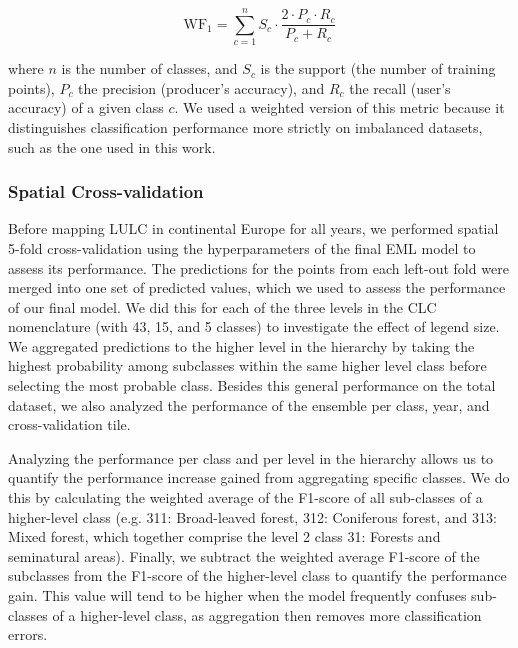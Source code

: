     \begin{equation}
        \mathrm{WF}_1 = \sum_{c=1}^{n}{S_{c} \cdot \frac{2 \cdot P_{c} \cdot R_{c}}{P_{c} + R_{c}}}
    \end{equation}
    
    \noindent where $n$ is the number of classes, and $S_{c}$ is the support (the number of training points), $P_{c}$ the precision (producer's accuracy), and $R_{c}$ the recall (user's accuracy) of a given class $c$. We used a weighted version of this metric because it distinguishes classification performance more strictly on imbalanced datasets, such as the one used in this work.
    
    
    
    \subsubsection*{Spatial Cross-validation}
        
        Before mapping LULC in continental Europe for all years, we performed spatial 5-fold cross-validation using the hyperparameters of the final EML model to assess its performance. The predictions for the points from each left-out fold were merged into one set of predicted values, which we used to assess the performance of our final model.
        We did this for each of the three levels in the CLC nomenclature (with 43, 15, and 5 classes) to investigate the effect of legend size. We aggregated predictions to the higher level in the hierarchy by taking the highest probability among subclasses within the same higher level class before selecting the most probable class. Besides this general performance on the total dataset, we also analyzed the performance of the ensemble per class, year, and cross-validation tile.
        
        Analyzing the performance per class and per level in the hierarchy allows us to quantify the performance increase gained from aggregating specific classes. We do this by calculating the weighted average of the F1-score of all sub-classes of a higher-level class (e.g. 311: Broad-leaved forest, 312: Coniferous forest, and 313: Mixed forest, which together comprise the level 2 class 31: Forests and seminatural areas). Finally, we subtract the weighted average F1-score of the subclasses from the F1-score of the higher-level class to quantify the performance gain. This value will tend to be higher when the model frequently confuses sub-classes of a higher-level class, as aggregation then removes more classification errors.
        
